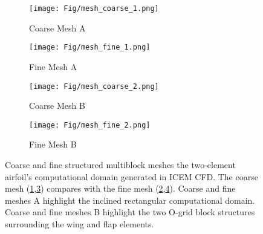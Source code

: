 \begin{figure}[H]
  \centering
  \begin{subfigure}[b]{0.49\textwidth}
    \texttt{[image: Fig/mesh\_coarse\_1.png]}
    \caption{Coarse Mesh A}
    \label{fig:coarse1}
  \end{subfigure}
  \hfill
  \begin{subfigure}[b]{0.49\textwidth}
    \texttt{[image: Fig/mesh\_fine\_1.png]}
    \caption{Fine Mesh A}
    \label{fig:fine1}
  \end{subfigure}

  \begin{subfigure}[b]{0.49\textwidth}
    \texttt{[image: Fig/mesh\_coarse\_2.png]}
    \caption{Coarse Mesh B}
    \label{fig:coarse2}
  \end{subfigure}
  \hfill
  \begin{subfigure}[b]{0.49\textwidth}
    \texttt{[image: Fig/mesh\_fine\_2.png]}
    \caption{Fine Mesh B}
    \label{fig:fine2}
  \end{subfigure}

  \caption{Coarse and fine structured multiblock meshes the two-element airfoil's computational domain generated in ICEM CFD. The coarse mesh (\ref{fig:coarse1},\ref{fig:coarse2}) compares with the fine mesh (\ref{fig:fine1},\ref{fig:fine2}). Coarse and fine meshes A highlight the inclined rectangular computational domain. Coarse and fine meshes B highlight the two O-grid block structures surrounding the wing and flap elements.}
  \label{fig:meshComparisonPart1}
\end{figure}

